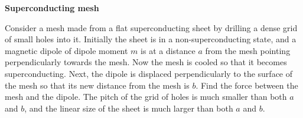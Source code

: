 {\Large\textbf{Superconducting mesh}}

Consider a mesh made from a flat superconducting sheet by drilling a dense grid
of small holes into it. Initially the sheet is in a non-superconducting state,
and a magnetic dipole of dipole moment $m$ is at a distance $a$ from the mesh
pointing perpendicularly towards the mesh. Now the mesh is cooled so that it
becomes superconducting. Next, the dipole is displaced perpendicularly to the
surface of the mesh so that its new distance from the mesh is $b$. Find the
force between the mesh and the dipole. The pitch of the grid of holes is much
smaller than both $a$ and $b$, and the linear size of the sheet is much larger
than both $a$ and $b$.

